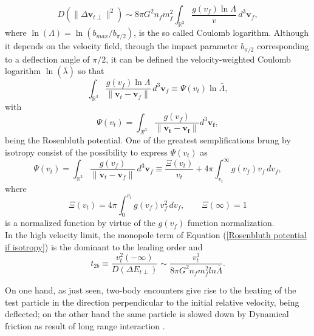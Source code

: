 \documentclass[12pt,twoside,openany]{book}
\begin{document}
\begin{equation}
D(\|\Delta \mathbf{v}_{t\perp}\|^2) \sim 8\pi G^2 n_f m_f^2 
\int_{\mathbb{R}^3} \frac{g(v_f)\ln \Lambda}{v} \, d^3 \mathbf{v}_f,
\end{equation}
where $\ln{(\Lambda)}=\ln{(b_{max}/b_{\pi/2})}$, is the so called Coulomb logarithm. Although it depends on the velocity field, through the impact parameter $b_{\pi/2}$ corresponding to a deflection angle of $\pi/2$, it can be defined the velocity-weighted Coulomb logarithm $\ln{(\bar{\lambda})}$ so that
\begin{equation}
\int_{\mathbb{R}^3} \frac{g(v_f)\ln \Lambda}{\|\mathbf{v}_t - \mathbf{v}_f\|} \, d^3 \mathbf{v}_f
\equiv \Psi(v_t)\ln \bar{\Lambda},
\end{equation}
with
\begin{equation}\label{Rosenbluth potential}
    \Psi(v_t)=\int_{\mathcal{R}^3}\frac{g(v_f)}{\|\mathbf{v_t}-\mathbf{v_f}\|}d^3\mathbf{v_f},
\end{equation}
being the Rosenbluth potential. One of the greatest semplifications brung by isotropy consist of the possibility to express $\Psi(v_t)$ as
\begin{equation}\label{Rosenbluth potential if isotropy}
\Psi(v_t) = \int_{\mathbb{R}^3} \frac{g(v_f)}{\|\mathbf{v}_t - \mathbf{v}_f\|} \, d^3 \mathbf{v}_f
\equiv \frac{\Xi(v_t)}{v_t} + 4\pi \int_{v_t}^{\infty} g(v_f) v_f \, dv_f,
\end{equation}
where
\begin{equation}
\Xi(v_t) = 4\pi \int_{0}^{v_t} g(v_f) v_f^2 \, dv_f,
\qquad
\Xi(\infty) = 1
\end{equation}
is a normalized function by virtue of the $g(v_f)$ function normalization.\\In the high velocity limit, the monopole term of Equation (\ref{Rosenbluth potential if isotropy}) is the dominant to the leading order and 
\begin{equation}\label{t_2b}
    t_{2b}\equiv\frac{v_t^2(-\infty)}{D(\Delta E_{t\perp})}\sim \frac{v_t^3}{8\pi G^2n_fm_f^2ln\bar\Lambda}.
\end{equation}

On one hand, as just seen, two-body encounters give rise to the heating of the test particle in the direction perpendicular to the initial relative velocity, being deflected; on the other hand the same particle is slowed down by Dynamical friction as result of long range interaction \cite{Baumgardt_2006}.
\end{document}

